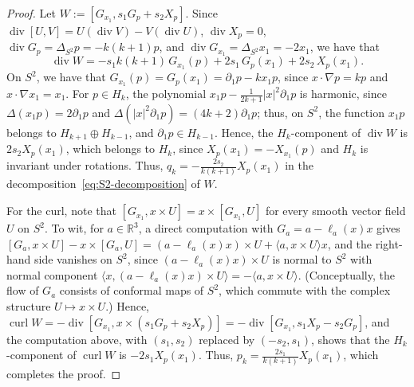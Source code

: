 \documentclass{article}
\newcommand{\R}{\mathbb{R}}
\theoremstyle{definition}
\theoremstyle{plain}
\begin{document}
\begin{proof}
Let $W:=[G_{x_1},s_1 G_p+s_2 X_p]$.
Since $\operatorname{div}[U,V]=U(\operatorname{div}V)-V(\operatorname{div}U)$, $\operatorname{div}X_p=0$, $\operatorname{div}G_p=\Delta_{S^2}p=-k(k+1)p$,
and $\operatorname{div}G_{x_1}=\Delta_{S^2}x_1=-2x_1$, we have that
$$
  \operatorname{div}W=-s_1 k(k+1)\,G_{x_1}(p)+2s_1 \, G_p(x_1)+2s_2 \, X_p(x_1).
$$
On $S^2$, we have that $G_{x_1}(p)=G_p(x_1)=\partial_1 p - k x_1 p$, since $x \cdot \nabla p=kp$ and $x \cdot \nabla x_1=x_1$.
For $p\in H_k$, the polynomial $x_1 p-\frac{1}{2k+1}|x|^2\partial_1 p$ is harmonic, since $\Delta(x_1 p)=2\partial_1 p$ and $\Delta(|x|^2\partial_1 p)=(4k+2)\partial_1 p$; thus,
    on $S^2$, the function $x_1 p$ belongs to $H_{k+1}\oplus H_{k-1}$, and $\partial_1 p\in H_{k-1}$.
Hence, the $H_k$-component of $\operatorname{div}W$ is $2s_2 X_p(x_1)$, which belongs to $H_k$, since $X_p(x_1)=-X_{x_1}(p)$ and $H_k$ is invariant under rotations.
Thus, $q_k=-\frac{2s_2}{k(k+1)}X_p(x_1)$ in the decomposition~\eqref{eq:S2-decomposition} of $W$.

For the curl, note that $[G_{x_1},x\times U]=x\times[G_{x_1},U]$ for every smooth vector field $U$ on $S^2$.
To wit, for $a\in\R^3$, a direct computation with $G_a= a - \ell_a(x)x$ gives $[G_a,x\times U]-x\times[G_a,U]=(a-\ell_a(x)x)\times U + \langle a,x\times U\rangle x$, and the right-hand side vanishes on $S^2$, since $(a-\ell_a(x) x)\times U$ is normal to $S^2$ with normal component $\langle x,(a-\ell_a(x)x)\times U\rangle=-\langle a , x\times U\rangle$.
(Conceptually, the flow of $G_a$ consists of conformal maps of $S^2$, which commute with the complex structure $U\mapsto x\times U$.)
Hence, $\operatorname{curl}W=-\operatorname{div}[G_{x_1},x\times(s_1 G_p+s_2 X_p)]=-\operatorname{div}[G_{x_1},s_1 X_p-s_2 G_p]$, and the computation above, with $(s_1,s_2)$ replaced by $(-s_2,s_1)$, shows that the $H_k$-component of $\operatorname{curl}W$ is $-2s_1 X_p(x_1)$.
Thus, $p_k=\frac{2s_1}{k(k+1)}X_p(x_1)$, which completes the proof.
\end{proof}
\end{document}
